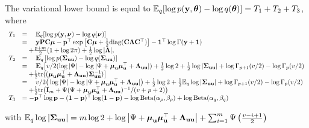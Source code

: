 			The variational lower bound is equal to ${\mathbb E}_q[\log{p({\bf y}, {\boldsymbol\theta})} - \log{q({\boldsymbol\theta})}] = T_1 + T_2 + T_3$,
			where
			$$
			\begin{array}{rl}
				T_1 & = \quad {\mathbb E}_q[\log{p({\bf y}, {\boldsymbol\nu})} - \log{q({\boldsymbol\nu})}]                                                                                                                                                  \\
				    & = \quad {\bf y} {\bf P} {\bf C} {\boldsymbol\mu} - {\bf p}^\top \exp{\left[ {\bf C}{\boldsymbol\mu}+ \frac{1}{2} \text{diag} ({\bf C}{\boldsymbol\Lambda}{\bf C}^\top) \right]} - {\bf 1}^\top\log \Gamma{({\bf y}+ {\bf1})}                                               \\
				    & \quad + \frac{p + m}{2} (1 + \log{2 \pi}) + \frac{1}{2} \log{|{\boldsymbol\Lambda}|},                                                                                                                                \\
				T_2 & = \quad {\textbf E}_q \left[ \log p({\boldsymbol \Sigma}_{{\bf u} {\bf u}}) - \log q({\boldsymbol \Sigma}_{{\bf u} {\bf u}}) \right]                                                                                                                 \\
				    & = \quad {\textbf E}_q \big[ v/2(\log |\Psi| - \log |\Psi + {\boldsymbol \mu}_{\bf u} {\boldsymbol \mu}_{\bf u}^\top + {\boldsymbol \Lambda}_{{\bf u} {\bf u}}|) + \frac{1}{2} \log 2 + \frac{1}{2} \log|{\boldsymbol \Sigma}_{{\bf u} {\bf u}}| + \log \Gamma_{p+1}(v/2) - \log \Gamma_{p}(v/2)    \\
				    & \quad + \frac{1}{2} \text{tr}(({\boldsymbol \mu}_{{\bf u}} {\boldsymbol \mu}_{{\bf u}}^\top + {\boldsymbol \Lambda}_{{\bf u} {\bf u}}) {\boldsymbol \Sigma}_{{\bf u} {\bf u}}^{-1}) \big]                                                                                                  \\
				    & = \quad v/2\big(\log |\Psi| - \log |\Psi + {\boldsymbol \mu}_{\bf u} {\boldsymbol \mu}_{\bf u}^\top + {\boldsymbol \Lambda}_{{\bf u} {\bf u}}|\big) + \frac{1}{2} \log 2 + \frac{1}{2} {\mathbb E}_q \log |{\boldsymbol \Sigma}_{{\bf u} {\bf u}}| + \log \Gamma_{p+1}(v/2) - \log \Gamma_{p}(v/2) \\
				    & \quad + \frac{1}{2} \text{tr}\big({\bf I}_m + \Psi(\Psi+ {\boldsymbol \mu}_{\bf u} {\boldsymbol \mu}_{\bf u}^\top + {\boldsymbol \Lambda}_{{\bf u} {\bf u}})^{-1}/(v + p + 2)\big)                                                                                        \\
				T_3 & = - {\bf p}^\top \log {\bf p} - ({\bf 1} - {\bf p})^\top \log ({\bf 1} - {\bf p}) - \log \text{Beta} (\alpha_\rho, \beta_\rho) + \log \text{Beta} (\alpha_q, \beta_q)                                                              
			\end{array}
			$$
					
			\noindent with ${\mathbb E}_q \log |{\boldsymbol \Sigma}_{{\bf u} {\bf u}}| = m \log 2 + \log \left | \Psi + {\boldsymbol \mu}_{\bf u} {\boldsymbol \mu}_{\bf u}^\top + {\boldsymbol \Lambda}_{{\bf u} {\bf u}} \right | + \sum_{i=1}^m \Psi \left ( \frac{v - i + 1}{2} \right )$

